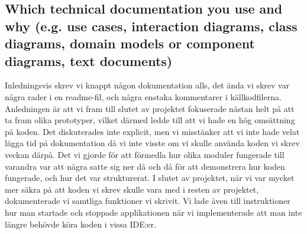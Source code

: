 \documentclass{scrartcl}
\begin{document}


\subsection{Which technical documentation you use and why (e.g. use cases, interaction diagrams, class diagrams, domain models or component diagrams, text documents)}\label{sec:which-technical-docs}


Inledningsvis skrev vi knappt någon dokumentation alls, det ända vi skrev var några rader i en readme-fil, och några enstaka kommentarer i källkodfilerna.
Anledningen är att vi fram till slutet av projektet fokuserade nästan helt på att ta fram olika prototyper, vilket därmed ledde till att vi hade en hög omsättning på koden.
Det diskuterades inte explicit, men vi misstänker att vi inte hade velat lägga tid på dokumentation då vi inte visste om vi skulle använda koden vi skrev veckan därpå.
Det vi gjorde för att förmedla hur olika moduler fungerade till varandra var att några satte sig ner då och då för att demonstrera hur koden fungerade, och hur det var strukturerat.
I slutet av projektet, när vi var mycket mer säkra på att koden vi skrev skulle vara med i resten av projektet, dokumenterade vi samtliga funktioner vi skrivit.
Vi lade även till instruktioner hur man startade och stoppade applikationen när vi implementerade att man inte längre behövde köra koden i vissa IDE:er.


\end{document}

